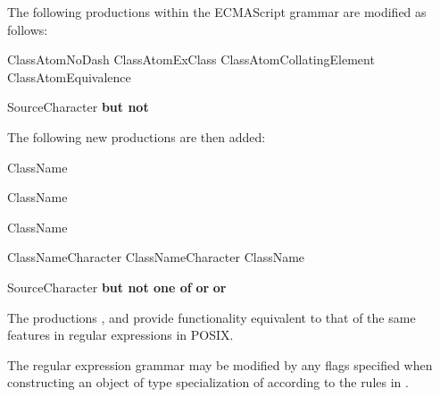 \pnum
The following productions within the ECMAScript grammar are modified as follows:

\begin{ncrebnf}
\br
  \terminal{-}\br
  ClassAtomNoDash\br
  ClassAtomExClass\br
  ClassAtomCollatingElement\br
  ClassAtomEquivalence
\end{ncrebnf}

\begin{ncrebnf}
\br
  SourceCharacter \textnormal{\textbf{but not}} 
\end{ncrebnf}

\pnum
The following new productions are then added:

\begin{ncrebnf}
\br
  \terminal{[:} ClassName \terminal{:]}
\end{ncrebnf}

\begin{ncrebnf}
\br
  \terminal{[.} ClassName \terminal{.]}
\end{ncrebnf}

\begin{ncrebnf}
\br
  \terminal{[=} ClassName \terminal{=]}
\end{ncrebnf}

\begin{ncrebnf}
\br
  ClassNameCharacter\br
  ClassNameCharacter ClassName
\end{ncrebnf}

\begin{ncrebnf}
\br
  SourceCharacter \textnormal{\textbf{but not one of}}  \textnormal{\textbf{or}} \terminal{=} \textnormal{\textbf{or}} \terminal{:}
\end{ncrebnf}

\pnum
The productions , 
and  provide functionality
equivalent to that of the same features in regular expressions in POSIX.

\pnum
The regular expression grammar may be modified by
any  flags specified when
constructing an object of type specialization of 
according to the rules in .

